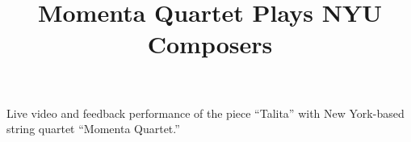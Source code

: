  \title{ Momenta Quartet Plays NYU Composers}
 \begin{position}
{ Live video and feedback performance of the piece ``Talita'' with New York-based string quartet ``Momenta Quartet.'' }
\end{position}
 


